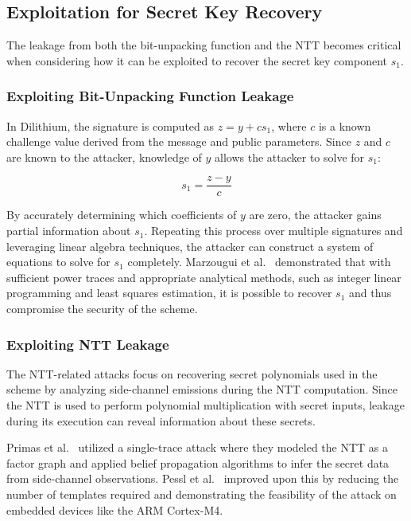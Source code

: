 \subsection{Exploitation for Secret Key Recovery}

The leakage from both the bit-unpacking function and the \ac{NTT} becomes critical when considering how it can be exploited to recover the secret key component $s_1$.

\subsubsection{Exploiting Bit-Unpacking Function Leakage}

In Dilithium, the signature is computed as $z = y + c s_1$, where $c$ is a known challenge value derived from the message and public parameters. Since $z$ and $c$ are known to the attacker, knowledge of $y$ allows the attacker to solve for $s_1$:

\[
    s_1 = \frac{z - y}{c}
\]

By accurately determining which coefficients of $y$ are zero, the attacker gains partial information about $s_1$. Repeating this process over multiple signatures and leveraging linear algebra techniques, the attacker can construct a system of equations to solve for $s_1$ completely. Marzougui et al.~\cite{Marzougui22} demonstrated that with sufficient power traces and appropriate analytical methods, such as integer linear programming and least squares estimation, it is possible to recover $s_1$ and thus compromise the security of the scheme.

\subsubsection{Exploiting \ac{NTT} Leakage}

The \ac{NTT}-related attacks focus on recovering secret polynomials used in the scheme by analyzing side-channel emissions during the \ac{NTT} computation. Since the \ac{NTT} is used to perform polynomial multiplication with secret inputs, leakage during its execution can reveal information about these secrets.

Primas et al.~\cite{Primas17} utilized a single-trace attack where they modeled the \ac{NTT} as a factor graph and applied belief propagation algorithms to infer the secret data from side-channel observations. Pessl et al.~\cite{Pessl19} improved upon this by reducing the number of templates required and demonstrating the feasibility of the attack on embedded devices like the ARM Cortex-M4.


